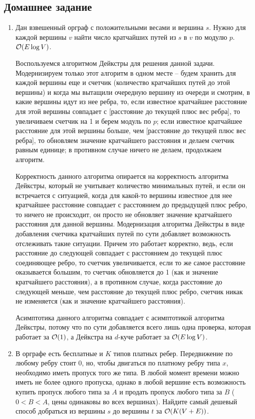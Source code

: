 \subsection{Домашнее задание}
\begin{enumerate}
  \item
    Дан взвешенный орграф с положительными весами и вершина $s$.
    Нужно для каждой вершины $v$ найти число кратчайших путей из $s$ в $v$ по модулю $p$. $\mathcal{O}(E \log V)$.
    \begin{solution}
      Воспользуемся алгоритмом Дейкстры для решения данной задачи. Модернизируем только этот алгоритм в одном месте -- будем хранить для каждой вершины еще и счетчик (количество кратчайших путей до этой вершины) и когда мы вытащили очередную вершину из очереди и смотрим, в какие вершины идут из нее ребра, то, если известное кратчайшее расстояние для этой вершины совпадает с [расстояние до текущей плюс вес ребра], то увеличиваем счетчик на 1 и берем модуль по $p$; если известное кратчайшее расстояние для этой вершины больше, чем [расстояние до текущей плюс вес ребра], то обновляем значение кратчайшего расстояния и делаем счетчик равным единице; в противном случае ничего не делаем, продолжаем алгоритм.

      Корректность данного алгоритма опирается на корректность алгоритма Дейкстры, который не учитывает количество минимальных путей, и если он встречается с ситуацией, когда для какой-то вершины известное для нее кратчайшее расстояние совпадает с расстоянием до предыдущей плюс ребро, то ничего не происходит, он просто не обновляет значение кратчайшего расстояния для данной вершины. Модернизация алгоритма Дейкстры в виде добавления счетчика кратчайших путей по сути добавляет возможность отслеживать такие ситуации. Причем это работает корректно, ведь, если расстояние до следующей совпадает с расстоянием до текущей плюс соединяющее ребро, то счетчик увеличивается, если то же самое расстояние оказывается большим, то счетчик обновляется до 1 (как и значение кратчайшего расстояния), а в противном случае, когда расстояние до следующей меньше, чем расстояние до текущей плюс ребро, счетчик никак не изменяется (как и значение кратчайшего расстояния).

      Асимптотика данного алгоритма совпадает с асимптотикой алгоритма Дейкстры, потому что по сути добавляется всего лишь одна проверка, которая работает за $\mathcal{O}(1)$, а Дейкстра на $d$-куче работает за $\mathcal{O}(E \log V)$.
    \end{solution}

  \item
    В орграфе есть бесплатные и $K$ типов платных ребер. Передвижение
    по любому ребру стоит $0$, но, чтобы двигаться по платному ребру
    типа $x$, необходимо иметь пропуск того же типа. В любой момент
    времени можно иметь не более одного пропуска, однако в любой
    вершине есть возможность купить пропуск любого типа за $A$ и
    продать пропуск любого типа за $B$ ($0 < B < A$, цены одинаковы
    во всех вершинах). Найдите самый дешевый способ добраться из вершины
    $s$ до вершины $t$ за $\mathcal{O}(K (V + E))$.


\end{enumerate}
